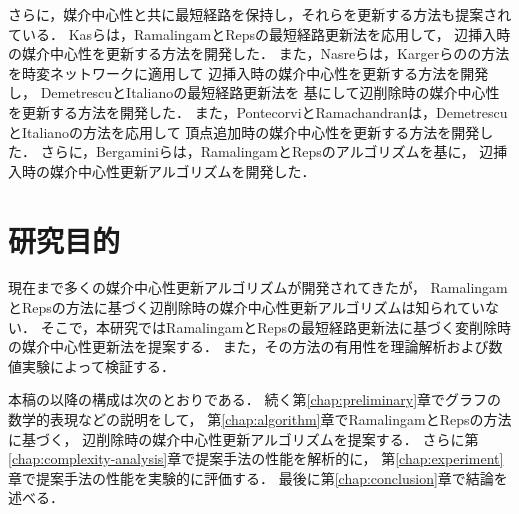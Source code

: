 さらに，媒介中心性と共に最短経路を保持し，それらを更新する方法も提案されている．
Kasらは，RamalingamとRepsの最短経路更新法\cite{Ramalingam1996}を応用して，
辺挿入時の媒介中心性を更新する方法を開発した\cite{Kas2013}．
また，Nasreらは，Kargerらの\cite{Karger1993}の方法を時変ネットワークに適用して
辺挿入時の媒介中心性を更新する方法を開発し\cite{Nasre2014a}，
DemetrescuとItalianoの最短経路更新法\cite{Demetrescu2003}を
基にして辺削除時の媒介中心性を更新する方法を開発した\cite{Nasre2014b}．
また，PontecorviとRamachandranは，DemetrescuとItalianoの方法を応用して
頂点追加時の媒介中心性を更新する方法を開発した\cite{Pontecorvi2015}．
さらに，Bergaminiらは，RamalingamとRepsのアルゴリズムを基に，
辺挿入時の媒介中心性更新アルゴリズムを開発した\cite{Bergamini2017}．

\section{研究目的}

現在まで多くの媒介中心性更新アルゴリズムが開発されてきたが，
RamalingamとRepsの方法に基づく辺削除時の媒介中心性更新アルゴリズムは知られていない．
そこで，本研究ではRamalingamとRepsの最短経路更新法に基づく変削除時の媒介中心性更新法を提案する．
また，その方法の有用性を理論解析および数値実験によって検証する．

本稿の以降の構成は次のとおりである．
続く第\ref{chap:preliminary}章でグラフの数学的表現などの説明をして，
第\ref{chap:algorithm}章でRamalingamとRepsの方法に基づく，
辺削除時の媒介中心性更新アルゴリズムを提案する．
さらに第\ref{chap:complexity-analysis}章で提案手法の性能を解析的に，
第\ref{chap:experiment}章で提案手法の性能を実験的に評価する．
最後に第\ref{chap:conclusion}章で結論を述べる．
